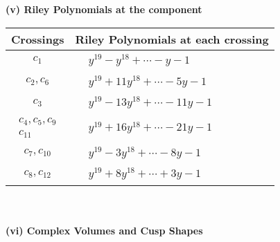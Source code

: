 \documentclass[1p]{elsarticle_modified}
\theoremstyle{definition}
\begin{document}
\newpage\renewcommand{\arraystretch}{1}
\flushleft \textbf{(v) Riley Polynomials at the component}\newline \\
\begin{tabular}{m{50pt}|m{274pt}}
Crossings & \hspace{64pt}Riley Polynomials at each crossing \\
\hline $$\begin{aligned}c_{1}\end{aligned}$$&$\begin{aligned}
&y^{19}- y^{18}+\cdots- y-1
\end{aligned}$\\
\hline $$\begin{aligned}c_{2},c_{6}\end{aligned}$$&$\begin{aligned}
&y^{19}+11 y^{18}+\cdots-5 y-1
\end{aligned}$\\
\hline $$\begin{aligned}c_{3}\end{aligned}$$&$\begin{aligned}
&y^{19}-13 y^{18}+\cdots-11 y-1
\end{aligned}$\\
\hline $$\begin{aligned}c_{4},c_{5},c_{9}\\c_{11}\end{aligned}$$&$\begin{aligned}
&y^{19}+16 y^{18}+\cdots-21 y-1
\end{aligned}$\\
\hline $$\begin{aligned}c_{7},c_{10}\end{aligned}$$&$\begin{aligned}
&y^{19}-3 y^{18}+\cdots-8 y-1
\end{aligned}$\\
\hline $$\begin{aligned}c_{8},c_{12}\end{aligned}$$&$\begin{aligned}
&y^{19}+8 y^{18}+\cdots+3 y-1
\end{aligned}$\\
\hline
\end{tabular}\\~\\
\newpage\flushleft \textbf{(vi) Complex Volumes and Cusp Shapes}
\end{document}
